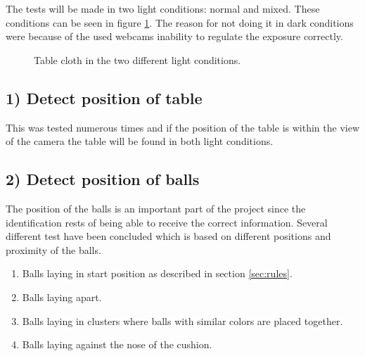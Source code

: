 
The tests will be made in two light conditions: normal and mixed. These conditions can be seen in figure \ref{fig:difflightcon}. The reason for not doing it in dark conditions were because of the used webcams inability to regulate the exposure correctly.\\

\begin{figure}[H]
  \centering
  \quad           
   \caption{Table cloth in the two different light conditions.}
  \label{fig:difflightcon}
\end{figure}


\subsection{1) Detect position of table}

This was tested numerous times and if the position of the table is within the view of the camera the table will be found in both light conditions.\\

\subsection{2) Detect position of balls}

The position of the balls is an important part of the project since the identification rests of being able to receive the correct information. Several different test have been concluded which is based on different positions and proximity of the balls.

\begin{enumerate}
\setlength{\itemsep}{0mm}
	\item Balls laying in start position as described in section \ref{sec:rules}.\\
	\item Balls laying apart.\\
	\item Balls laying in clusters where balls with similar colors are placed together.\\
	\item Balls laying against the nose of the cushion.\\
\end{enumerate}


